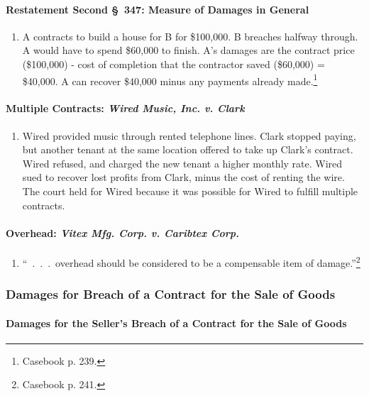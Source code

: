 \paragraph{Restatement Second \S\ 347: Measure of Damages in General}

\begin{enumerate}
    \item A contracts to build a house for B for \$100,000. B breaches 
    halfway through. A would have to spend \$60,000 to finish. A's damages are 
    the contract price (\$100,000) - cost of completion that the contractor 
    saved (\$60,000) = \$40,000. A can recover \$40,000 minus any payments 
    already made.\footnote{Casebook p. 239.}
\end{enumerate}

\paragraph{Multiple Contracts: \emph{Wired Music, Inc. v. Clark}}

\begin{enumerate}
    \item Wired provided music through rented telephone lines. Clark stopped 
    paying, but another tenant at the same location offered to take up Clark's 
    contract. Wired refused, and charged the new tenant a higher monthly rate. 
    Wired sued to recover lost profits from Clark, minus the cost of renting 
    the wire. The court held for Wired because it was possible for Wired to 
    fulfill multiple contracts.
\end{enumerate}

\paragraph{Overhead: \emph{Vitex Mfg. Corp. v. Caribtex Corp.}}

\begin{enumerate}
    \item ``~.~.~.~overhead should be considered to be a compensable item of 
    damage.''\footnote{Casebook p. 241.}
\end{enumerate}

\subsubsection{Damages for Breach of a Contract for the Sale of Goods}

\paragraph{Damages for the Seller's Breach of a Contract for the Sale of 
Goods}

